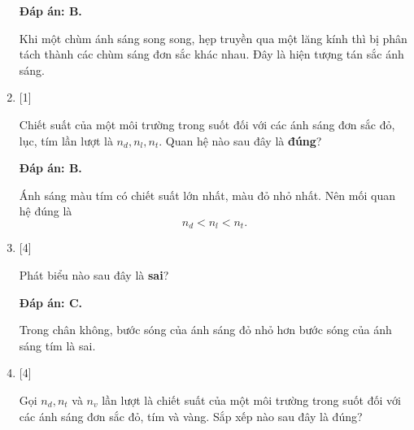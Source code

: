 \begin{enumerate}[label=\bfseries Câu \arabic*:]
	\loigiai
	{		\textbf{Đáp án: B.}
		
Khi một chùm ánh sáng song song, hẹp truyền qua một lăng kính thì bị phân tách thành các chùm sáng đơn sắc khác nhau. Đây là hiện tượng tán sắc ánh sáng.
		
	}

	\item {} [1]
	
	\cauhoi
	{Chiết suất của một môi trường trong suốt đối với các ánh sáng đơn sắc đỏ, lục, tím lần lượt là $n_{d}, n_{l}, n_{t}$. Quan hệ nào sau đây là \textbf{đúng}?
	}
	
	\loigiai
	{		\textbf{Đáp án: B.}
		
Ánh sáng màu tím có chiết suất lớn nhất, màu đỏ nhỏ nhất. Nên mối quan hệ đúng là
$$
n_{d} < n_{l} < n_{t}.
$$
		
	}
	
    \item {} [4]
    
	\cauhoi
	{Phát biểu nào sau đây là \textbf{sai}?
	}
	
	\loigiai
	{		\textbf{Đáp án: C.}
		
Trong chân không, bước sóng của ánh sáng đỏ nhỏ hơn bước sóng của ánh sáng tím là sai.
		
	}

    \item {} [4]
    
	\cauhoi
	{Gọi $n_{d}, n_{t}$ và $n_{v}$ lần lượt là chiết suất của một môi trường trong suốt đối với các ánh sáng đơn sắc đỏ, tím và vàng. Sắp xếp nào sau đây là đúng?
	}
	

\end{enumerate}
